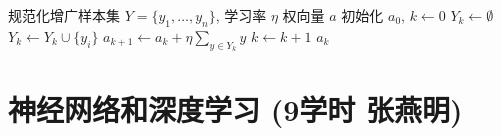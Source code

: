 \documentclass[a4paper, 11pt]{ctexart}
\begin{document}
\begin{algorithm}[H]
    \caption{批处理感知器算法 (Batch Perceptron)}
    \begin{algorithmic}[1]
    \Require 规范化增广样本集 $Y=\{y_1, \dots, y_n\}$, 学习率 $\eta$
    \Ensure 权向量 $a$
    \State 初始化 $a_0$, $k \gets 0$
    \Repeat
        \State $Y_k \gets \emptyset$ 
                \State $Y_k \gets Y_k \cup \{y_i\}$
            \EndIf
        \EndFor
        \State $a_{k+1} \gets a_k + \eta \sum_{y \in Y_k} y$ 
        \State $k \gets k + 1$
    \State \Return $a_k$
    \end{algorithmic}
\end{algorithm}

\newpage
\section{神经网络和深度学习 \small{(9学时 张燕明)}}
\end{document}
